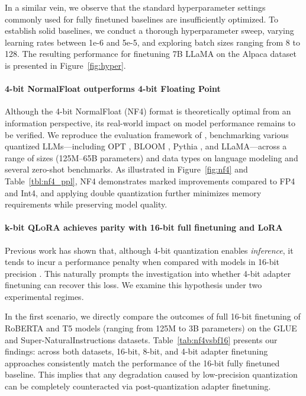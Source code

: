 In a similar vein, we observe that the standard hyperparameter settings commonly used for fully finetuned baselines are insufficiently optimized. To establish solid baselines, we conduct a thorough hyperparameter sweep, varying learning rates between 1e-6 and 5e-5, and exploring batch sizes ranging from 8 to 128. The resulting performance for finetuning 7B LLaMA on the Alpaca dataset is presented in Figure~\ref{fig:hyper}.

\paragraph{4-bit NormalFloat outperforms 4-bit Floating Point}

Although the 4-bit NormalFloat (NF4) format is theoretically optimal from an information perspective, its real-world impact on model performance remains to be verified. We reproduce the evaluation framework of \citet{dettmers2022case}, benchmarking various quantized LLMs—including OPT \citep{zhang2022opt}, BLOOM \cite{scao2022bloom}, Pythia \cite{biderman2023pythia}, and LLaMA—across a range of sizes (125M–65B parameters) and data types on language modeling and several zero-shot benchmarks. As illustrated in Figure~\ref{fig:nf4} and Table~\ref{tbl:nf4_ppl}, NF4 demonstrates marked improvements compared to FP4 and Int4, and applying double quantization further minimizes memory requirements while preserving model quality.

\paragraph{k-bit \textsc{QLoRA} achieves parity with 16-bit full finetuning and LoRA}

Previous work has shown that, although 4-bit quantization enables \emph{inference}, it tends to incur a performance penalty when compared with models in 16-bit precision \citep{dettmers2022case,frantar2022gptq}. This naturally prompts the investigation into whether 4-bit adapter finetuning can recover this loss. We examine this hypothesis under two experimental regimes.

In the first scenario, we directly compare the outcomes of full 16-bit finetuning of RoBERTA and T5 models (ranging from 125M to 3B parameters) on the GLUE and Super-NaturalInstructions datasets. Table~\ref{tab:nf4vsbf16} presents our findings: across both datasets, 16-bit, 8-bit, and 4-bit adapter finetuning approaches consistently match the performance of the 16-bit fully finetuned baseline. This implies that any degradation caused by low-precision quantization can be completely counteracted via post-quantization adapter finetuning.

